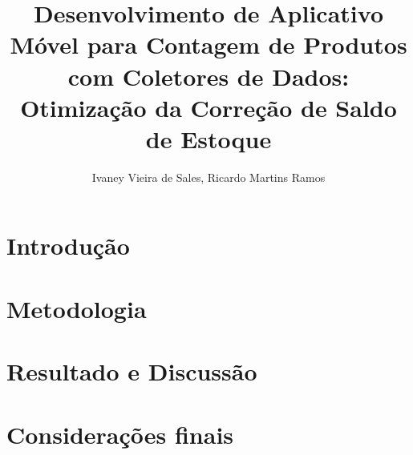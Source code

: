 \documentclass[12pt]{article}
\title{Desenvolvimento de Aplicativo Móvel para Contagem de Produtos com Coletores de Dados: Otimização da Correção de Saldo de Estoque}
\author{Ivaney Vieira de Sales\inst{1}, Ricardo Martins Ramos\inst{2}}
\begin{document}
 

\maketitle

\begin{resumo}

  
  
\end{resumo}

\begin{abstract}

  

\end{abstract}

\section{Introdução}



\section{Metodologia}



\section{Resultado e Discussão}



\section{Considerações finais}






\end{document}

